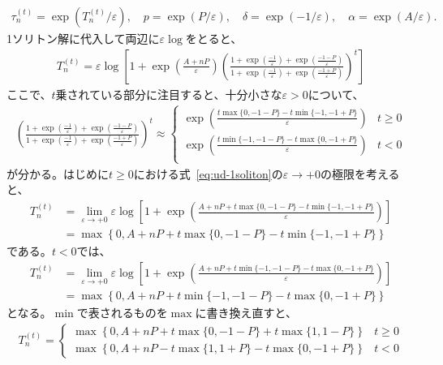\documentclass{jsarticle}
\begin{document}
\begin{enumerate}
\begin{align}
\tau_{n}^{(t)}=\exp\left(T_{n}^{(t)}/\varepsilon\right),\quad
p=\exp\left(P/\varepsilon\right),\quad
\delta=\exp\left(-1/\varepsilon\right),\quad
\alpha=\exp\left(A/\varepsilon\right).
\end{align}
1ソリトン解に代入して両辺に$\varepsilon\log$をとると、
\begin{align}
T_{n}^{(t)}=\varepsilon\log\left[
1+\exp\left(\frac{A+nP}{\varepsilon}\right)
\left(
\frac{1+\exp\left(\frac{-1}{\varepsilon}\right)+\exp\left(\frac{-1-P}{\varepsilon}\right)}
{1+\exp\left(\frac{-1}{\varepsilon}\right)+\exp\left(\frac{-1+P}{\varepsilon}\right)}
\right)^{t}
\right]
\label{eq:ud-1soliton}
\end{align}
ここで、$t$乗されている部分に注目すると、十分小さな$\varepsilon>0$について、
\begin{align}
\left(
\frac{1+\exp\left(\frac{-1}{\varepsilon}\right)+\exp\left(\frac{-1-P}{\varepsilon}\right)}
{1+\exp\left(\frac{-1}{\varepsilon}\right)+\exp\left(\frac{-1+P}{\varepsilon}\right)}
\right)^{t}\approx
\begin{cases}
\exp\left(\frac{t\max\{0,-1-P\}-t\min\{-1,-1+P\}}{\varepsilon}\right) & t\geq 0\\
\exp\left(\frac{t\min\{-1,-1-P\}-t\max\{0,-1+P\}}{\varepsilon}\right) & t< 0\\
\end{cases}
\end{align}
が分かる。はじめに$t\geq0$における式~\eqref{eq:ud-1soliton}の$\varepsilon\to+0$の極限を考えると、
\begin{align}
T_{n}^{(t)}&=\lim_{\varepsilon\to+0}\varepsilon\log\left[
1+\exp\left(\frac{A+nP+t\max\{0,-1-P\}-t\min\{-1,-1+P\}}{\varepsilon}\right)
\right]\\
&=\max\left\{0,A+nP+t\max\{0,-1-P\}-t\min\{-1,-1+P\}\right\}
\end{align}
である。$t<0$では、
\begin{align}
T_{n}^{(t)}&=\lim_{\varepsilon\to+0}\varepsilon\log\left[
1+\exp\left(\frac{A+nP+t\min\{-1,-1-P\}-t\max\{0,-1+P\}}{\varepsilon}\right)
\right]\\
&=\max\left\{0,A+nP+t\min\{-1,-1-P\}-t\max\{0,-1+P\}\right\}
\end{align}
となる。$\min$で表されるものを$\max$に書き換え直すと、
\begin{align}
T_{n}^{(t)}=
\begin{cases}
\max\left\{0,A+nP+t\max\{0,-1-P\}+t\max\{1,1-P\}\right\} & t\geq0\\
\max\left\{0,A+nP-t\max\{1,1+P\}-t\max\{0,-1+P\}\right\} & t<0

\end{cases}
\end{align}
\end{enumerate}
\end{document}
